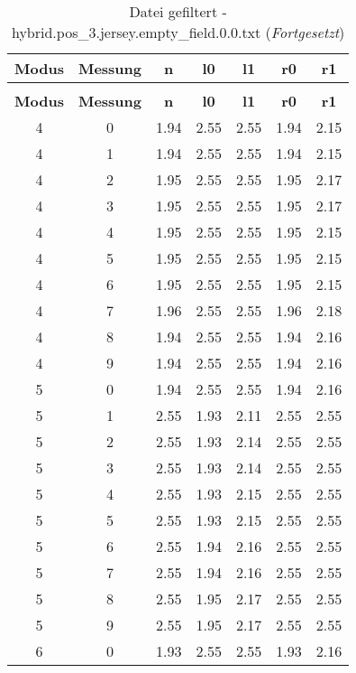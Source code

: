 \begin{longtable}{|c|c||c||c|c||c|c|}
	\caption{Datei gefiltert - hybrid.pos\_3.jersey.empty\_field.0.0.txt} \label{tab:hybrid.pos-3.jersey.empty-field.0.0.txt} \\ \hline
	\textbf{Modus} & \textbf{Messung} & \textbf{n} & \textbf{l0} & \textbf{l1} & \textbf{r0} & \textbf{r1}\\ \hline
	\endfirsthead
	\caption[]{Datei gefiltert - hybrid.pos\_3.jersey.empty\_field.0.0.txt (\emph{Fortgesetzt})} \\ \hline
	\textbf{Modus} & \textbf{Messung} & \textbf{n} & \textbf{l0} & \textbf{l1} & \textbf{r0} & \textbf{r1}\\ \hline
	\endhead
	4 & 0 & 1.94 & 2.55 & 2.55 & 1.94 & 2.15 \\ \hline
	4 & 1 & 1.94 & 2.55 & 2.55 & 1.94 & 2.15 \\ \hline
	4 & 2 & 1.95 & 2.55 & 2.55 & 1.95 & 2.17 \\ \hline
	4 & 3 & 1.95 & 2.55 & 2.55 & 1.95 & 2.17 \\ \hline
	4 & 4 & 1.95 & 2.55 & 2.55 & 1.95 & 2.15 \\ \hline
	4 & 5 & 1.95 & 2.55 & 2.55 & 1.95 & 2.15 \\ \hline
	4 & 6 & 1.95 & 2.55 & 2.55 & 1.95 & 2.15 \\ \hline
	4 & 7 & 1.96 & 2.55 & 2.55 & 1.96 & 2.18 \\ \hline
	4 & 8 & 1.94 & 2.55 & 2.55 & 1.94 & 2.16 \\ \hline
	4 & 9 & 1.94 & 2.55 & 2.55 & 1.94 & 2.16 \\ \hline
	5 & 0 & 1.94 & 2.55 & 2.55 & 1.94 & 2.16 \\ \hline
	5 & 1 & 2.55 & 1.93 & 2.11 & 2.55 & 2.55 \\ \hline
	5 & 2 & 2.55 & 1.93 & 2.14 & 2.55 & 2.55 \\ \hline
	5 & 3 & 2.55 & 1.93 & 2.14 & 2.55 & 2.55 \\ \hline
	5 & 4 & 2.55 & 1.93 & 2.15 & 2.55 & 2.55 \\ \hline
	5 & 5 & 2.55 & 1.93 & 2.15 & 2.55 & 2.55 \\ \hline
	5 & 6 & 2.55 & 1.94 & 2.16 & 2.55 & 2.55 \\ \hline
	5 & 7 & 2.55 & 1.94 & 2.16 & 2.55 & 2.55 \\ \hline
	5 & 8 & 2.55 & 1.95 & 2.17 & 2.55 & 2.55 \\ \hline
	5 & 9 & 2.55 & 1.95 & 2.17 & 2.55 & 2.55 \\ \hline
	6 & 0 & 1.93 & 2.55 & 2.55 & 1.93 & 2.16 \\ \hline

\end{longtable}
